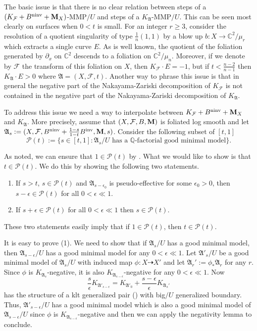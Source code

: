 \documentclass[12pt]{amsart}
\numberwithin{equation}{section}
\newcommand{\Mm}{{\bf{M}}}
\newcommand{\ninv}{\operatorname{ninv}}
\newcommand{\inv}{\operatorname{inv}}
\newcommand{\Aa}{{\mathfrak{A}}}
\newcommand{\Ff}{\mathcal{F}}
\theoremstyle{definition}
\theoremstyle{definition}
\theoremstyle{definition}
\begin{document}
The basic issue is that there is no clear relation between steps of a
$(K_{\Ff}+B^{\ninv}+\Mm_X)$-MMP$/U$ and steps of a $K_{\Aa}$-MMP$/U$.  This can be seen most clearly on surfaces when $0<t$ is small.  For an integer $r\ge 3$, consider the resolution of a quotient singularity of type $\frac{1}{n}(1, 1)$ by a blow up $b\colon X \to \mathbb C^2/\mu_r$ which extracts a single curve $E$.  As is well known, the quotient of the foliation generated by $\partial_x$ on $\mathbb C^2$ descends to a foliation on $\mathbb C^2/\mu_n$.
Moreover, if we denote by $\mathcal F$ the transform of this foliation on $X$, then $K_{\mathcal F}\cdot E = -1$, but if $t< \frac{n-2}{n-1}$ then $K_{\Aa}\cdot E >0$ where $\Aa=(X,\Ff,t)$.  Another way to phrase this issue is that in general the negative part of the Nakayama-Zariski decomposition of $K_{\mathcal F}$
is not contained in the negative part of the Nakayama-Zariski decomposition of $K_{\Aa}$.


To address this issue we need a way to interpolate between 
$K_{\Ff}+B^{\ninv}+\Mm_X$ and $K_{\Aa}$.
More precisely, assume that $(X,\Ff,B,\Mm)$ is foliated log smooth and let $\Aa_s:=(X,\Ff,B^{\ninv}+\frac{1-s}{1-t}B^{\inv},\Mm,s)$. 
Consider the following subset of $[t, 1]$ 
\[\mathcal P(t) := \{s \in [t, 1]: \Aa_s/U \text{ has a } \mathbb Q\text{-factorial good minimal model}\}.\]


As noted, we can ensure that $1 \in \mathcal P(t)$ by \cite[Theorem 1.5]{LMX24}. What we would like to show is that $t \in \mathcal P(t)$.
We do this by showing the following two statements.

\begin{enumerate}
\item If $s>t$, $s\in \mathcal P(t)$ and $\Aa_{s-\epsilon_0}$ is pseudo-effective for some $\epsilon_0>0$, then $s-\epsilon \in \mathcal P(t)$ for all $0<\epsilon \ll 1$.
\item If $s+\epsilon \in \mathcal P(t)$ for all $0<\epsilon \ll 1$ then $s \in \mathcal P(t)$.
\end{enumerate}
These two statements easily imply that if $1 \in \mathcal P(t)$, then $t \in \mathcal P(t)$.

It is easy to prove (1). We need to show that if $\Aa_s/U$ has a good minimal model, then $\Aa_{s-\epsilon}/U$ has a good minimal model for any $0<\epsilon\ll 1$.  Let $\Aa'_s/U$ be a good minimal model of $\Aa_s/U$ with induced map $\phi\colon X\dashrightarrow X'$ and let $\Aa_r':=\phi_*\Aa_r$ for any $r$. Since $\phi$ is $K_{\Aa_s}$-negative, it is also $K_{\Aa_{s-\epsilon}}$-negative for any $0<\epsilon\ll 1$. Now
$$\frac{s}{\epsilon}K_{\Aa'_{s-\epsilon}}=K_{\Aa'_0}+\frac{s-\epsilon}{\epsilon}K_{\Aa_s'}$$
has the structure of a klt generalized pair (\cite[Proposition 3.3]{CHLMSSX24}) with big$/U$ generalized boundary. Thus, $\Aa'_{s-\epsilon}/U$ has a good minimal model which is also a good minimal model of $\Aa_{s-\epsilon}/U$ since $\phi$ is $K_{\Aa_{s-\epsilon}}$-negative and then we can apply the negativity lemma to conclude.
\end{document}
